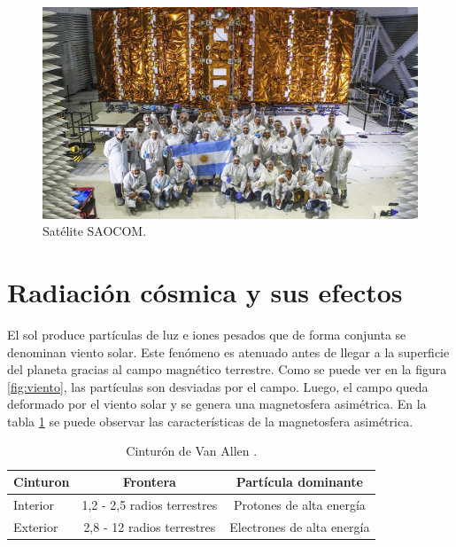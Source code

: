 \begin{figure}[htbp]
	\centering
	\includegraphics[width=\textwidth]{./Figures/invapsaocom.jpg}
	\caption{Satélite SAOCOM\protect\footnotemark.}
	\label{fig:saocom}
\end{figure}


\section{Radiación cósmica y sus efectos}
\label{sec:radiacion}

El sol produce partículas de luz e iones pesados que de forma conjunta se denominan viento solar.
Este fenómeno es atenuado antes de llegar a la superficie del planeta gracias al campo magnético terrestre.
Como se puede ver en la figura \ref{fig:viento}, las partículas son desviadas por el campo.
Luego, el campo queda deformado por el viento solar y se genera una magnetosfera asimétrica.
En la tabla \ref{tab:capasmagneticas} se puede observar las características de la magnetosfera asimétrica.

\begin{table}[h]
	\centering
	\caption[Cinturón de Van Allen]{Cinturón de Van Allen \citep{WEBSITE:structure_space_radiation}.}
	\begin{tabular}{l c c}    
		\toprule
		\textbf{Cinturon} & \textbf{Frontera}           & \textbf{Partícula dominante}\\
		\midrule
		Interior          & 1,2 - 2,5 radios terrestres & Protones de alta energía\\		
		Exterior          & 2,8 - 12 radios terrestres  & Electrones de alta energía\\
		\bottomrule
		\hline
	\end{tabular}
	\label{tab:capasmagneticas}
\end{table}

